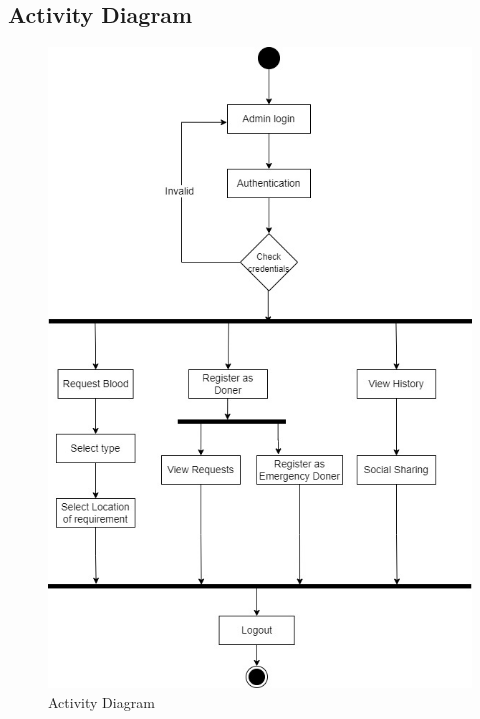 \subsection{Activity Diagram}
\begin{figure}[hbt!]
    \centering
    \includegraphics[width=145mm]{images/activity.jpg}
    \caption{Activity Diagram}
    \label{fig:Activity Diagram }
\end{figure}

\newpage
